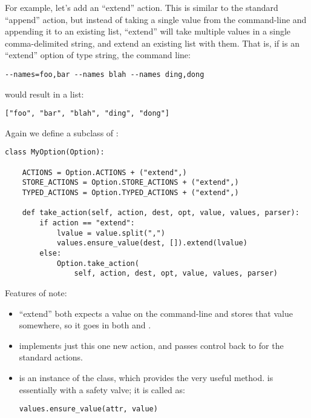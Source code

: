 For example, let's add an ``extend'' action.  This is similar to the
standard ``append'' action, but instead of taking a single value from
the command-line and appending it to an existing list, ``extend'' will
take multiple values in a single comma-delimited string, and extend an
existing list with them.  That is, if  is an
``extend'' option of type string, the command line:

\begin{verbatim}
--names=foo,bar --names blah --names ding,dong
\end{verbatim}

would result in a list:

\begin{verbatim}
["foo", "bar", "blah", "ding", "dong"]
\end{verbatim}

Again we define a subclass of :

\begin{verbatim}
class MyOption(Option):

    ACTIONS = Option.ACTIONS + ("extend",)
    STORE_ACTIONS = Option.STORE_ACTIONS + ("extend",)
    TYPED_ACTIONS = Option.TYPED_ACTIONS + ("extend",)

    def take_action(self, action, dest, opt, value, values, parser):
        if action == "extend":
            lvalue = value.split(",")
            values.ensure_value(dest, []).extend(lvalue)
        else:
            Option.take_action(
                self, action, dest, opt, value, values, parser)
\end{verbatim}

Features of note:

\begin{itemize}
\item ``extend'' both expects a value on the command-line and stores that
value somewhere, so it goes in both  and
.

\item {} implements just this one new
action, and passes control back to  for
the standard  actions.

\item {} is an instance of the  class, which
provides the very useful 
method.  is essentially 
with a safety valve; it is called as:

\begin{verbatim}
values.ensure_value(attr, value)
\end{verbatim}
\end{itemize}

